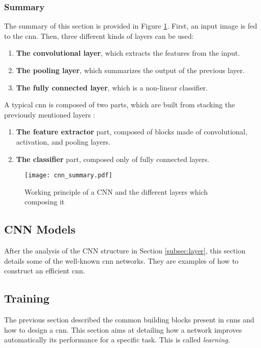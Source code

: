 \subsubsection{Summary}
%
The summary of this section is provided in Figure \ref{fig:layer:summary}. First, an input image is fed to the \acrshort{cnn}. Then, three different kinds of layers can be used:
%
\begin{enumerate}
    \item \textbf{The convolutional layer}, which extracts the features from the input.
    \item \textbf{The pooling layer}, which summarizes the output of the previous layer.
    \item \textbf{The fully connected layer}, which is a non-linear classifier.
\end{enumerate}
%
A typical \acrshort{cnn} is composed of two parts, which are built from stacking the previously mentioned layers \cite{matteucci_artificial_2019}:
\begin{enumerate}
    \item \textbf{The feature extractor} part, composed of blocks made of convolutional, activation, and pooling layers.
    \item \textbf{The classifier} part, composed only of fully connected layers.
\end{enumerate}
%
\begin{figure}[H]
    \centering
    \texttt{[image: cnn\_summary.pdf]}
    \caption{Working principle of a CNN and the different layers which composing it}
    \label{fig:layer:summary}
\end{figure}
%
\subsection{CNN Models} \label{subsec:models}
After the analysis of the CNN structure in Section \ref{subsec:layer}, this section details some of the well-known \acrshort{cnn} networks. They are examples of how to construct an efficient \acrshort{cnn}.

%

%
%
\subsection{Training} \label{subsec:train}
The previous section described the common building blocks present in \acrshort{cnn}s and how to design a \acrshort{cnn}. This section aims at detailing how a network improves automatically its performance for a specific task. This is called \textit{learning}.

